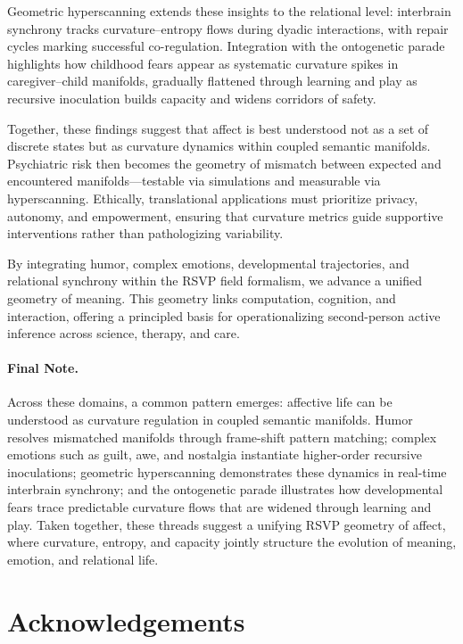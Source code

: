 \documentclass{article}
\theoremstyle{definition}
\begin{document}
Geometric hyperscanning extends these insights to the relational level: 
interbrain synchrony tracks curvature–entropy flows during dyadic interactions, 
with repair cycles marking successful co-regulation. Integration with the 
ontogenetic parade highlights how childhood fears appear as systematic 
curvature spikes in caregiver–child manifolds, gradually flattened through 
learning and play as recursive inoculation builds capacity and widens 
corridors of safety.

Together, these findings suggest that affect is best understood not as a set 
of discrete states but as curvature dynamics within coupled semantic 
manifolds. Psychiatric risk then becomes the geometry of mismatch between 
expected and encountered manifolds—testable via simulations and measurable 
via hyperscanning. Ethically, translational applications must prioritize 
privacy, autonomy, and empowerment, ensuring that curvature metrics guide 
supportive interventions rather than pathologizing variability.

By integrating humor, complex emotions, developmental trajectories, and 
relational synchrony within the RSVP field formalism, we advance a unified 
geometry of meaning. This geometry links computation, cognition, and 
interaction, offering a principled basis for operationalizing second-person 
active inference across science, therapy, and care.

\paragraph{Final Note.} 
Across these domains, a common pattern emerges: affective life can be 
understood as curvature regulation in coupled semantic manifolds. Humor resolves 
mismatched manifolds through frame-shift pattern matching; complex emotions 
such as guilt, awe, and nostalgia instantiate higher-order recursive inoculations; 
geometric hyperscanning demonstrates these dynamics in real-time interbrain 
synchrony; and the ontogenetic parade illustrates how developmental fears trace 
predictable curvature flows that are widened through learning and play. Taken 
together, these threads suggest a unifying RSVP geometry of affect, where 
curvature, entropy, and capacity jointly structure the evolution of meaning, 
emotion, and relational life.


\section{Acknowledgements}
\end{document}
